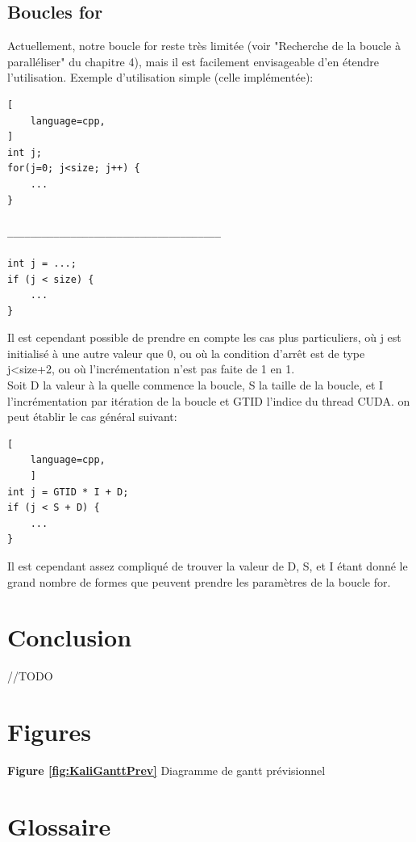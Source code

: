 \documentclass{article}
\begin{document}
	
	\subsection{Boucles for}
	
	Actuellement, notre boucle for reste très limitée (voir "Recherche de la boucle à paralléliser" du chapitre 4), mais il est facilement envisageable d'en étendre l'utilisation.
	Exemple d'utilisation simple (celle implémentée):
			\begin{lstlisting}[
    language=cpp,
]
int j;
for(j=0; j<size; j++) {
	...
}

_____________________________________

int j = ...;
if (j < size) {
	...
}
	\end{lstlisting}
	Il est cependant possible de prendre en compte les cas plus particuliers, où j est initialisé à une autre valeur que 0, ou où la condition d'arrêt est de type j\textless size+2, ou où l'incrémentation n'est pas faite de 1 en 1.
	\\Soit D la valeur à la quelle commence la boucle, S la taille de la boucle, et I l'incrémentation par itération de la boucle et GTID l'indice du thread CUDA. on peut établir le cas général suivant:
	\begin{lstlisting}[
    language=cpp,
    ]
int j = GTID * I + D;
if (j < S + D) {
	...
}
	\end{lstlisting}
	
	Il est cependant assez compliqué de trouver la valeur de D, S, et I étant donné le grand nombre de formes que peuvent prendre les paramètres de la boucle for.

	\section{Conclusion}
	
	//TODO
	
	
	\section*{Figures}
\indent
\textbf{Figure \ref{fig:KaliGanttPrev}} Diagramme de gantt prévisionnel\\
\indent



\section*{Glossaire}
\renewcommand{\glossarysection}[2][]{}
\end{document}
